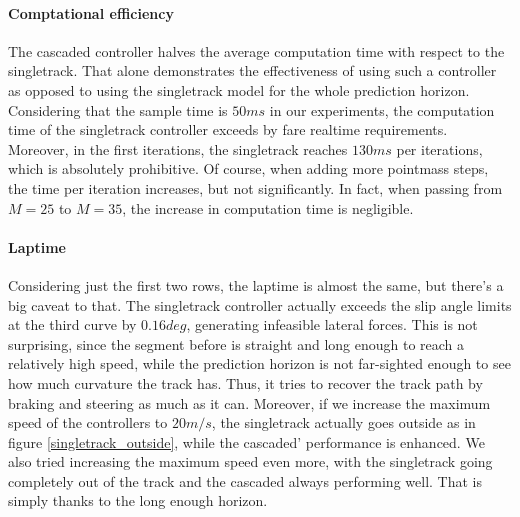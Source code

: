 \documentclass[a4paper, onecolumn, 12pt]{article}
\begin{document}
\paragraph{Comptational efficiency}
The cascaded controller halves the average computation time with respect to the
singletrack. That alone demonstrates the effectiveness of using such a
controller as opposed to using the singletrack model for the whole prediction
horizon. Considering that the sample time is $50ms$ in our experiments, the
computation time of the singletrack controller exceeds by fare realtime
requirements. Moreover, in the first iterations, the singletrack reaches $130ms$
per iterations, which is absolutely prohibitive. Of course, when adding more
pointmass steps, the time per iteration increases, but not significantly. In
fact, when passing from $M=25$ to $M=35$, the increase in computation time is
negligible.

\paragraph{Laptime}
Considering just the first two rows, the laptime is almost the same, but there's
a big caveat to that. The singletrack controller actually exceeds the slip angle
limits at the third curve by $0.16 deg$, generating infeasible lateral forces.
This is not surprising, since the segment before is straight and long enough to
reach a relatively high speed, while the prediction horizon is not far-sighted
enough to see how much curvature the track has. Thus, it tries to recover the
track path by braking and steering as much as it can. Moreover, if we increase
the maximum speed of the controllers to $20 m/s$, the singletrack actually goes
outside as in figure \ref{singletrack_outside}, while the cascaded' performance
is enhanced. We also tried increasing the maximum speed even more, with the
singletrack going completely out of the track and the cascaded always performing
well. That is simply thanks to the long enough horizon.
\end{document}
